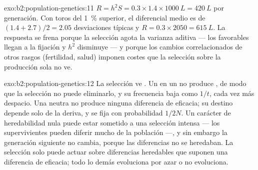 \begin{solution}{exo:b2:population-genetics:11}
$R = h^{2}S = 0.3\times 1.4\times \qty{1000}{L} = \qty{420}{L}$ por
generación. Con toros del \qty{1}{\%} superior, el diferencial medio es de
$(1.4 + 2.7)/2 = 2.05$ desviaciones típicas y $R =
0.3\times 2050 = \qty{615}{L}$. La respuesta se frena porque la selección
agota la varianza aditiva --- los  favorables llegan a la fijación y
$h^{2}$ disminuye --- y porque los cambios correlacionados de otros rasgos
(fertilidad, salud) imponen costes que la selección sobre la producción
sola no ve.
\end{solution}

\begin{solution}{exo:b2:population-genetics:12}
La selección ve . Un   en un  no produce
, de modo que la selección no puede eliminarlo, y su frecuencia
baja como $1/t$, cada vez más despacio. Una  neutra no produce
ninguna diferencia de eficacia; su destino depende solo de la deriva, y se
fija con probabilidad $1/2N$. Un carácter de heredabilidad nula puede
estar sometido a una selección intensa --- los supervivientes pueden
diferir mucho de la población ---, y sin embargo la generación siguiente
no cambia, porque las diferencias no se heredaban. La selección solo puede
actuar sobre diferencias heredables que suponen una diferencia de
eficacia; todo lo demás evoluciona por azar o no evoluciona.
\end{solution}

